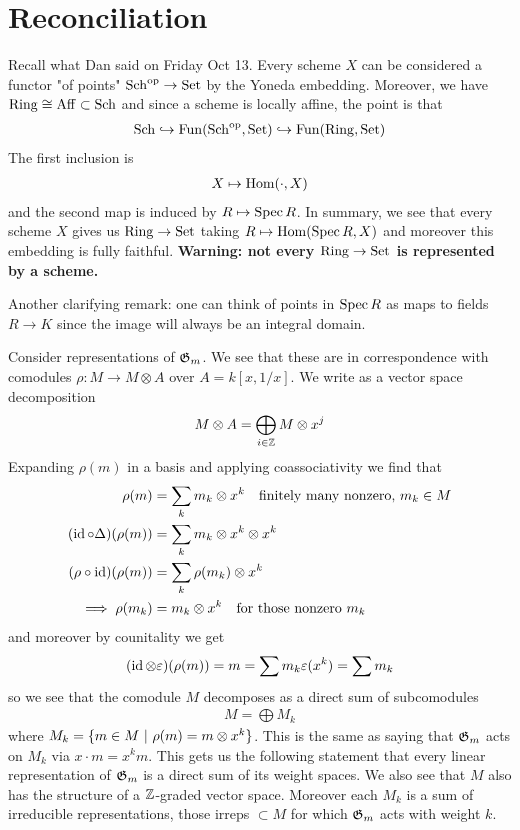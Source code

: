 \documentclass[12pt]{article}
\begin{document}
\section{Reconciliation}
Recall what Dan said on Friday Oct 13. Every scheme $X$ can be considered a functor "of points" $\operatorname{Sch}^{\operatorname{op}} \to\operatorname{Set}$ by the Yoneda embedding.  Moreover, we have $\operatorname{Ring}\cong\operatorname{Aff}\subset\operatorname{Sch}$ and since a scheme is locally affine, the point is that \begin{align*}
    \operatorname{Sch}\hookrightarrow\operatorname{Fun}(\operatorname{Sch}^{\operatorname{op}},\operatorname{Set})\hookrightarrow\operatorname{Fun}(\operatorname{Ring},\operatorname{Set})
\end{align*} The first inclusion is \begin{align*}
    X\mapsto\operatorname{Hom}(\cdot,X)
\end{align*} and the second map is induced by $R\mapsto\operatorname{Spec} R$. In summary, we see that every scheme $X$ gives us $\operatorname{Ring}\to\operatorname{Set}$ taking $R\mapsto\operatorname{Hom}(\operatorname{Spec} R,X)$ and moreover this embedding is fully faithful. \textbf{Warning: not every $\operatorname{Ring}\to\operatorname{Set}$ is represented by a scheme.}

\hfill

Another clarifying remark: one can think of points in $\operatorname{Spec} R$ as maps to fields $R\to K$ since the image will always be an integral domain. 

\begin{example}
Consider representations of $\mathfrak{G}_m$. We see that these are in correspondence with comodules $\rho:M\to M\otimes A$ over $A = k[x,1/x]$. We write as a vector space decomposition\begin{align*}
    M\otimes A = \bigoplus_{i\in\mathbb{Z}} M\otimes x^j
\end{align*} Expanding $\rho(m)$ in a basis and applying coassociativity we find that \begin{align*}
    \rho(m) &= \sum_{k} m_k\otimes x^{k} \text{\quad finitely many nonzero, $m_k\in M$}\\
    (\operatorname{id}\circ\Delta)(\rho(m)) &= \sum_k m_k\otimes x^k\otimes x^k \\
    (\rho\circ\operatorname{id})(\rho(m)) &= \sum_k \rho(m_k)\otimes x^k \\
\implies \rho(m_k) &= m_k\otimes x^k \text{\quad for those nonzero $m_k$}
\end{align*} and moreover by counitality we get \begin{align*}
    (\operatorname{id}\otimes\varepsilon)(\rho(m)) = m = \sum m_k\varepsilon(x^k) = \sum m_k
\end{align*} so we see that the comodule $M$ decomposes as a direct sum of subcomodules \begin{align*}
    M = \bigoplus M_k
\end{align*} where $M_k = \{m\in M \ \vert \  \rho(m) = m\otimes x^k\}$. This is the same as saying that $\mathfrak{G}_m$ acts on $M_k$ via $x\cdot m = x^km$. This gets us the following statement that every linear representation of $\mathfrak{G}_m$ is a direct sum of its weight spaces. We also see that $M$ also has the structure of a $\mathbb{Z}$-graded vector space. Moreover each $M_k$ is a sum of irreducible representations, those irreps $\subset M$ for which $\mathfrak{G}_m$ acts with weight $k$. 
\end{example}
\end{document}
